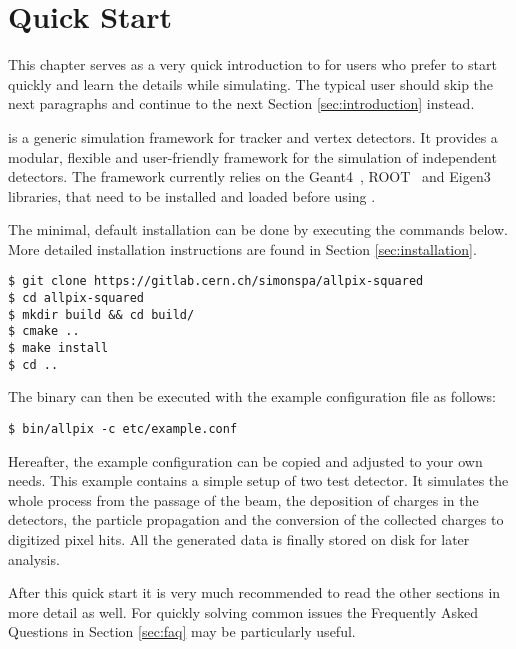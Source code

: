 \section{Quick Start}
This chapter serves as a very quick introduction to \apsq for users who prefer to start quickly and learn the details while simulating. The typical user should skip the next paragraphs and continue to the next Section \ref{sec:introduction} instead. 

\apsq is a generic simulation framework for tracker and vertex detectors. It provides a modular, flexible and user-friendly framework for the simulation of independent detectors. The framework currently relies on the Geant4~\cite{geant4}, ROOT~\cite{root} and Eigen3~\cite{eigen3} libraries, that need to be installed and loaded before using \apsq.

The minimal, default installation can be done by executing the commands below. More detailed installation instructions are found in Section \ref{sec:installation}.
\begin{verbatim}
$ git clone https://gitlab.cern.ch/simonspa/allpix-squared
$ cd allpix-squared
$ mkdir build && cd build/
$ cmake ..
$ make install
$ cd ..
\end{verbatim}
The binary can then be executed with the example configuration file as follows:
\begin{verbatim}
$ bin/allpix -c etc/example.conf
\end{verbatim}

Hereafter, the example configuration can be copied and adjusted to your own needs. This example contains a simple setup of two test detector. It simulates the whole process from the passage of the beam, the deposition of charges in the detectors, the particle propagation and the conversion of the collected charges to digitized pixel hits. All the generated data is finally stored on disk for later analysis.

After this quick start it is very much recommended to read the other sections in more detail as well. For quickly solving common issues the Frequently Asked Questions in Section \ref{sec:faq} may be particularly useful.
